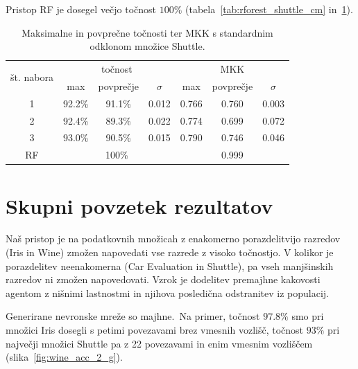 \documentclass[a4paper,12pt,openright]{book}
\begin{document}
    Pristop RF je dosegel večjo točnost $100\%$ (tabela~\ref{tab:rforest_shuttle_cm} in~\ref{tab:shuttle_result_aggregate}).

    \begin{table}[H]
        \begin{center}
            \begin{tabular}{|| c | c c c || c c c ||}
                \hline
                \multirow{2}{*}{št. nabora} & \multicolumn{3}{c||}{točnost} & \multicolumn{3}{c||}{MKK} \\ \cline{2-7}
                & max    & povprečje & $\sigma$ & max   & povprečje & $\sigma$ \\
                \hline
                1 & 92.2\% & 91.1\%    & 0.012    & 0.766 & 0.760     & 0.003    \\
                2 & 92.4\% & 89.3\%    & 0.022    & 0.774 & 0.699     & 0.072    \\
                3 & 93.0\% & 90.5\%    & 0.015    & 0.790 & 0.746     & 0.046    \\ \hline
                RF & \multicolumn{3}{c||}{100\%} & \multicolumn{3}{c||}{0.999} \\
                \hline
            \end{tabular}
        \end{center}
        \caption{Maksimalne in povprečne točnosti ter MKK s standardnim odklonom množice Shuttle.}
        \label{tab:shuttle_result_aggregate}
    \end{table}

    \newpage

    \section{Skupni povzetek rezultatov}\label{sec:skupni-povzetek-rezultatov}
    Naš pristop je na podatkovnih množicah z enakomerno porazdelitvijo razredov (Iris in Wine) zmožen napovedati vse
    razrede z visoko točnostjo.
    V kolikor je porazdelitev neenakomerna (Car Evaluation in Shuttle), pa vseh manjšinskih razredov ni zmožen napovedovati.
    Vzrok je dodelitev premajhne kakovosti agentom z nišnimi lastnostmi in njihova posledična odstranitev iz populacij.

    Generirane nevronske mreže so majhne.\ Na primer, točnost $97.8\%$ smo pri množici Iris dosegli s petimi povezavami brez vmesnih vozlišč, točnost $93\%$ pri
    največji množici Shuttle pa z 22 povezavami in enim vmesnim vozliščem (slika~\ref{fig:wine_acc_2_g}).
\end{document}
